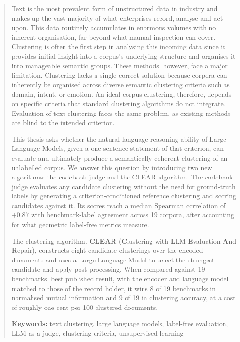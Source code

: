 \documentclass[11pt,a4paper,oneside]{report}
\begin{document}
\begin{abstract}

Text is the most prevalent form of unstructured data in industry and makes up the vast majority of what enterprises record, analyse and act upon. This data routinely accumulates in enormous volumes with no inherent organisation, far beyond what manual inspection can cover. Clustering is often the first step in analysing this incoming data since it provides initial insight into a corpus's underlying structure and organises it into manageable semantic groups. These methods, however, face a major limitation. Clustering lacks a single correct solution because corpora can inherently be organised across diverse semantic clustering criteria such as domain, intent, or emotion. An ideal corpus clustering, therefore, depends on specific criteria that standard clustering algorithms do not integrate. Evaluation of text clustering faces the same problem, as existing methods are blind to the intended criterion.

This thesis asks whether the natural language reasoning ability of Large Language Models, given a one-sentence statement of that criterion, can evaluate and ultimately produce a semantically coherent clustering of an unlabelled corpus. We answer this question by introducing two new algorithms: the codebook judge and the CLEAR algorithm. The codebook judge evaluates any candidate clustering without the need for ground-truth labels by generating a criterion-conditioned reference clustering and scoring candidates against it. Its scores reach a median Spearman correlation of $+0.87$ with benchmark-label agreement across 19 corpora, after accounting for what geometric label-free metrics measure.

The clustering algorithm, \textbf{CLEAR} (\textbf{C}lustering with \textbf{L}LM \textbf{E}valuation \textbf{A}nd \textbf{R}epair), constructs eight candidate clusterings over the encoded documents and uses a Large Language Model to select the strongest candidate and apply post-processing. When compared against 19 benchmarks' best published result, with the encoder and language model matched to those of the record holder, it wins 8 of 19 benchmarks in normalised mutual information and 9 of 19 in clustering accuracy, at a cost of roughly one cent per 100 clustered documents.


\vspace{\baselineskip}
\noindent\textbf{Keywords:} text clustering, large language models, label-free evaluation, LLM-as-a-judge, clustering criteria, unsupervised learning
\end{abstract}
\end{document}
